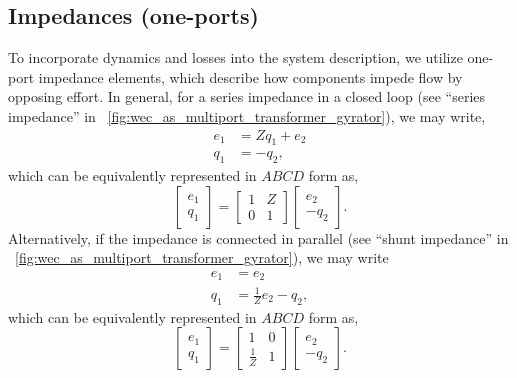 \documentclass[twocolumn]{autart}
\begin{document}
\subsection{Impedances (one-ports)}\label{sec:impedances}
To incorporate dynamics and losses into the system description, we utilize one-port impedance elements, which describe how components impede flow by opposing effort. 
In general, for a series impedance in a closed loop (see ``series impedance'' in \figurename~\ref{fig:wec_as_multiport_transformer_gyrator}), we may write,
%
\begin{subequations}
        \begin{align}
                e_1 &= Zq_1 + e_2 \\
                q_1 &= -q_2 ,
        \end{align}
        \label{eq:impedance_eom}%
\end{subequations}
%
which can be equivalently represented in $ABCD$ form as,
%
\begin{equation}
        \begin{bmatrix}
                e_1 \\ q_1
        \end{bmatrix}
        =
        \begin{bmatrix}
                1 & Z \\ 0 & 1
        \end{bmatrix}
        \begin{bmatrix}
                e_2 \\ - q_2
        \end{bmatrix} .
        \label{eq:impedance_abcd}%
\end{equation}
%
Alternatively, if the impedance is connected in parallel (see ``shunt impedance'' in \figurename~\ref{fig:wec_as_multiport_transformer_gyrator}), we may write
%
\begin{subequations}
        \begin{align}
                e_1 &=  e_2 \\
                q_1 &= \frac{1}{Z} e_2 - q_2 ,
        \end{align}
        \label{eq:parallel_impedance_eom}%
\end{subequations}
%
which can be equivalently represented in $ABCD$ form as,
%
\begin{equation}
        \begin{bmatrix}
                e_1 \\ q_1
        \end{bmatrix}
        =
        \begin{bmatrix}
                1 & 0 \\ \frac{1}{Z} & 1
        \end{bmatrix}
        \begin{bmatrix}
                e_2 \\ - q_2
        \end{bmatrix} .
        \label{eq:parallel_impedance_abcd}%
\end{equation}
\end{document}
